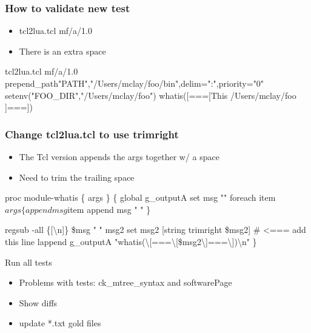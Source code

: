 \documentclass{beamer}
\begin{document}
\begin{frame}[fragile]
    \frametitle{How to validate new test}
  \begin{itemize}
    \item tcl2lua.tcl mf/a/1.0
    \item There is an extra space
  \end{itemize}
 {\tiny
    \begin{semiverbatim}
tcl2lua.tcl mf/a/1.0                
prepend_path{"PATH","/Users/mclay/foo/bin",delim=":",priority="0"}
setenv("FOO_DIR","/Users/mclay/foo")
whatis([===[This /Users/mclay/foo ]===])
    \end{semiverbatim}
}
\end{frame}

\begin{frame}[fragile]
    \frametitle{Change tcl2lua.tcl to use trimright}
  \begin{itemize}
    \item The Tcl version appends the args together w/ a space
    \item Need to trim the trailing space
  \end{itemize}
 {\tiny
    \begin{semiverbatim}
proc module-whatis \{ args \} \{
    global g\_outputA
    set msg ""
    foreach item $args \{
       append msg $item
       append msg " "
    \}

    regsub -all \{[\textbackslash{}n]\} \$msg  " " msg2
    {\color{blue}{}set msg2 [string trimright \$msg2]  # <=== add this line}
    lappend g\_outputA  "whatis(\textbackslash{}[===\textbackslash{}[\$msg2\textbackslash{}]===\textbackslash{}])\textbackslash{}n"
\}
    \end{semiverbatim}
}
\end{frame}

\begin{frame}{Run all tests}
  \begin{itemize}
    \item Problems with tests: ck\_mtree\_syntax and softwarePage 
    \item Show diffs
    \item update *.txt gold files
  \end{itemize}
\end{frame}
\end{document}
